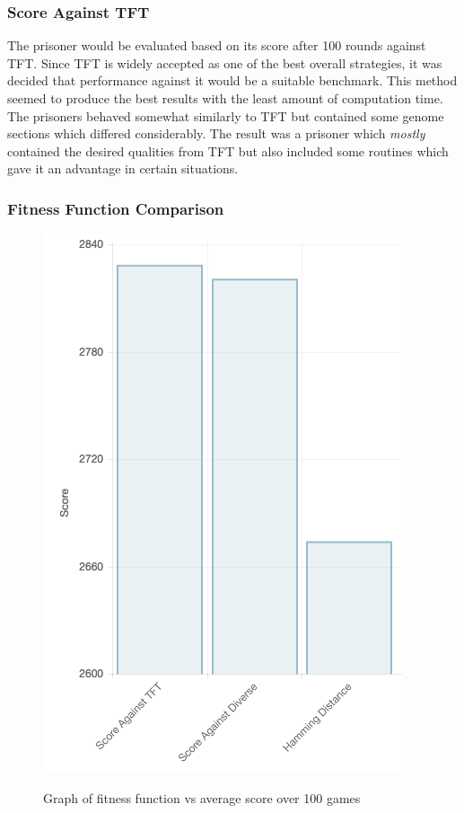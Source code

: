 \documentclass[12pt]{article}
\begin{document}
\subsubsection{Score Against TFT}
\label{tft}

The prisoner would be evaluated based on its score after 100 rounds against
TFT.  Since TFT is widely accepted as one of the best overall strategies, it was
decided that performance against it would be a suitable benchmark.
This method seemed to produce the best results with the least
amount of computation time.  The prisoners behaved somewhat similarly
to TFT but contained some genome sections which differed considerably.  The result was a prisoner which \textit{mostly} contained the desired qualities from TFT
but also included some routines which gave it an advantage in certain situations.


\subsubsection{Fitness Function Comparison}

\begin{figure}[h]
    \label{fig2}
    \centering
    \includegraphics[scale=0.5]{figures/fit_score.png}
    \label{fig1}
    \caption{Graph of fitness function vs average score over 100 games}
\end{figure}
\end{document}
